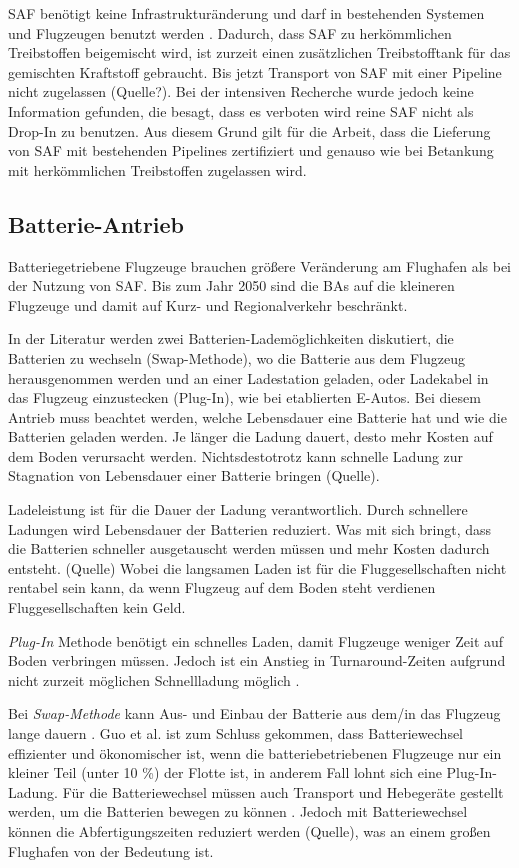 SAF benötigt keine Infrastrukturänderung und darf in bestehenden Systemen und Flugzeugen benutzt werden \cite{dalmia2022powering}.
Dadurch, dass SAF zu herkömmlichen Treibstoffen beigemischt wird, ist zurzeit einen zusätzlichen Treibstofftank 
für das gemischten Kraftstoff gebraucht. Bis jetzt Transport von SAF mit einer Pipeline nicht zugelassen (Quelle?).
Bei der intensiven Recherche wurde jedoch keine Information gefunden, die besagt, dass es verboten wird reine SAF nicht als
Drop-In zu benutzen. Aus diesem Grund gilt für die Arbeit, dass die Lieferung von SAF mit bestehenden Pipelines 
zertifiziert und genauso wie bei Betankung mit herkömmlichen Treibstoffen zugelassen wird.

\subsection{Batterie-Antrieb}
Batteriegetriebene Flugzeuge brauchen größere Veränderung am Flughafen als bei der Nutzung von SAF.
Bis zum Jahr 2050 sind die BAs auf die kleineren Flugzeuge und damit auf Kurz- und Regionalverkehr beschränkt. 

In der Literatur werden zwei Batterien-Lademöglichkeiten diskutiert, die Batterien zu wechseln (Swap-Methode), 
wo die Batterie aus dem Flugzeug herausgenommen werden und 
an einer Ladestation geladen, oder Ladekabel in das Flugzeug einzustecken (Plug-In), wie bei etablierten E-Autos.
%
Bei diesem Antrieb muss beachtet werden, welche Lebensdauer eine Batterie hat und wie die Batterien geladen werden. 
Je länger die Ladung dauert, desto mehr Kosten auf dem Boden verursacht werden. Nichtsdestotrotz kann schnelle Ladung 
zur Stagnation von Lebensdauer einer Batterie bringen (Quelle).

Ladeleistung ist für die Dauer der Ladung verantwortlich. Durch schnellere Ladungen wird Lebensdauer der Batterien reduziert. 
Was mit sich bringt, dass die Batterien schneller ausgetauscht werden müssen
und mehr Kosten dadurch entsteht. (Quelle) Wobei die langsamen Laden ist für die Fluggesellschaften nicht rentabel sein kann, 
da wenn Flugzeug auf dem Boden steht verdienen Fluggesellschaften kein Geld.


\textit{Plug-In} Methode benötigt ein schnelles Laden, damit Flugzeuge weniger Zeit auf Boden verbringen müssen.
Jedoch ist ein Anstieg in Turnaround-Zeiten aufgrund nicht zurzeit möglichen Schnellladung möglich \cite{avogadro2024demystifying}.

Bei \textit{Swap-Methode} kann Aus- und Einbau der Batterie aus dem/in das Flugzeug lange dauern \cite{dalmia2022powering}. 
Guo et al. \cite{guo2020aviation} ist zum Schluss gekommen, dass Batteriewechsel effizienter und ökonomischer ist, 
wenn die batteriebetriebenen Flugzeuge nur ein kleiner Teil (unter 10 \%) der Flotte ist, in anderem Fall lohnt sich eine Plug-In-Ladung. 
Für die Batteriewechsel müssen auch Transport und Hebegeräte gestellt werden, um die Batterien bewegen zu können \cite{reimers2018introduction}.
Jedoch mit Batteriewechsel können die Abfertigungszeiten reduziert werden (Quelle), was an einem großen Flughafen von der Bedeutung ist. 

